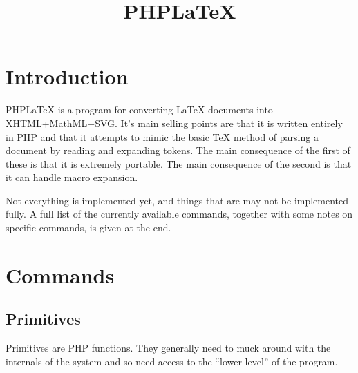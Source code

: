 \documentclass{webpage}
\title{PHPLaTeX}
\begin{document}
\section{Introduction}

PHPLaTeX is a program for converting LaTeX documents into XHTML+MathML+SVG.
It's main selling points are that it is written entirely in PHP and that it attempts to mimic the basic TeX method of parsing a document by reading and expanding tokens.
The main consequence of the first of these is that it is extremely portable.
The main consequence of the second is that it can handle macro expansion.

Not everything is implemented yet, and things that are may not be implemented fully.
A full list of the currently available commands, together with some notes on specific commands, is given at the end.

\section{Commands}

\subsection{Primitives}

Primitives are PHP functions.
They generally need to muck around with the internals of the system and so need access to the ``lower level'' of the program.

\showAllCommands
\end{document}
